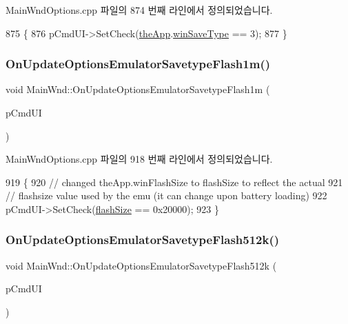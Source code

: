 Main\+Wnd\+Options.\+cpp 파일의 874 번째 라인에서 정의되었습니다.


\begin{DoxyCode}
875 \{
876   pCmdUI->SetCheck(\mbox{\hyperlink{_v_b_a_8cpp_a8095a9d06b37a7efe3723f3218ad8fb3}{theApp}}.\mbox{\hyperlink{class_v_b_a_a70060f88010280739406c87ef66d036a}{winSaveType}} == 3);
877 \}
\end{DoxyCode}
\mbox{\label{class_main_wnd_a9626a5265957c4674aff99fec01356bf}} 
\subsubsection{\texorpdfstring{On\+Update\+Options\+Emulator\+Savetype\+Flash1m()}{OnUpdateOptionsEmulatorSavetypeFlash1m()}}
{\footnotesize\ttfamily void Main\+Wnd\+::\+On\+Update\+Options\+Emulator\+Savetype\+Flash1m (\begin{DoxyParamCaption}\item[{C\+Cmd\+UI $\ast$}]{p\+Cmd\+UI }\end{DoxyParamCaption})\hspace{0.3cm}{\ttfamily [protected]}}



Main\+Wnd\+Options.\+cpp 파일의 918 번째 라인에서 정의되었습니다.


\begin{DoxyCode}
919 \{
920   \textcolor{comment}{// changed theApp.winFlashSize to flashSize to reflect the actual}
921   \textcolor{comment}{// flashsize value used by the emu (it can change upon battery loading)}
922   pCmdUI->SetCheck(\mbox{\hyperlink{_flash_8cpp_a6cc360d6cd58f7c4ea981de97c808179}{flashSize}} == 0x20000);
923 \}
\end{DoxyCode}
\mbox{\label{class_main_wnd_ae2bb26c3109ad3cb4cdd3a81b2584477}} 
\subsubsection{\texorpdfstring{On\+Update\+Options\+Emulator\+Savetype\+Flash512k()}{OnUpdateOptionsEmulatorSavetypeFlash512k()}}
{\footnotesize\ttfamily void Main\+Wnd\+::\+On\+Update\+Options\+Emulator\+Savetype\+Flash512k (\begin{DoxyParamCaption}\item[{C\+Cmd\+UI $\ast$}]{p\+Cmd\+UI }\end{DoxyParamCaption})\hspace{0.3cm}{\ttfamily [protected]}}



